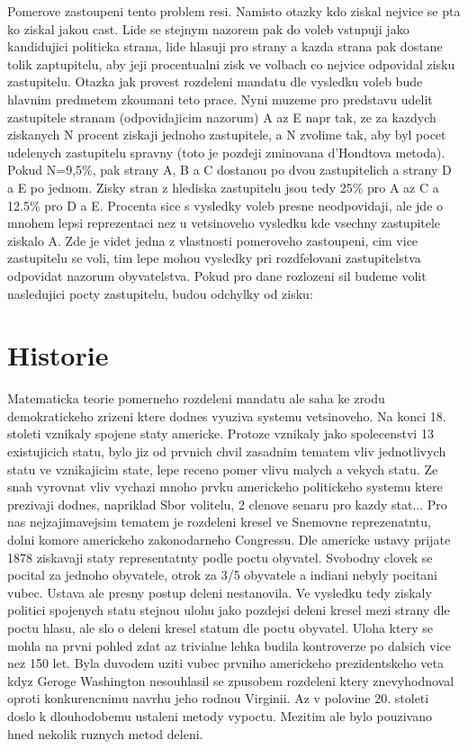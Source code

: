 \documentclass[12pt,a4paper]{article}
\begin{document}
Pomerove zastoupeni tento problem resi. Namisto otazky kdo ziskal nejvice se pta ko ziskal jakou cast. Lide se stejnym nazorem pak do voleb vstupuji jako kandidujici politicka strana, lide hlasuji pro strany a kazda strana pak dostane tolik zaptupitelu, aby jeji procentualni zisk ve volbach co nejvice odpovidal zisku zastupitelu. Otazka jak provest rozdeleni mandatu dle vysledku voleb bude hlavnim predmetem zkoumani teto prace. Nyni muzeme pro predstavu udelit zastupitele stranam (odpovidajicim nazorum) A az E napr tak, ze za kazdych ziskanych N procent ziskaji jednoho zastupitele, a N zvolime tak, aby byl pocet udelenych zastupitelu spravny (toto je pozdeji zminovana d'Hondtova metoda). Pokud N=9,5\%, pak strany A, B a C dostanou po dvou zastupitelich a strany D a E po jednom. Zisky stran z hlediska zastupitelu jsou tedy 25\% pro A az C a 12.5\% pro D a E. Procenta sice s vysledky voleb presne neodpovidaji, ale jde o mnohem lepsi reprezentaci nez u vetsinoveho vysledku kde vsechny zastupitele ziskalo A. Zde je videt jedna z vlastnosti pomeroveho zastoupeni, cim vice zastupitelu se voli, tim lepe mohou vysledky pri rozdfelovani zastupitelstva odpovidat nazorum obyvatelstva. Pokud pro dane rozlozeni sil budeme volit nasledujici pocty zastupitelu, budou odchylky od  zisku:

\section{Historie}
Matematicka teorie pomerneho rozdeleni mandatu ale saha ke zrodu demokratickeho zrizeni ktere dodnes vyuziva systemu vetsinoveho. Na konci 18. stoleti vznikaly spojene staty americke. Protoze vznikaly jako spolecenstvi 13 existujicich statu, bylo jiz od prvnich chvil zasadnim tematem vliv jednotlivych statu ve vznikajicim state, lepe receno pomer vlivu malych a vekych statu. Ze snah vyrovnat vliv vychazi mnoho prvku americkeho politickeho systemu ktere prezivaji dodnes, napriklad Sbor volitelu, 2 clenove senaru pro kazdy stat... 
Pro nas nejzajimavejsim tematem je rozdeleni kresel ve Snemovne reprezenatntu, dolni komore americkeho zakonodarneho Congressu. Dle americke ustavy prijate 1878 ziskavaji staty representatnty podle poctu obyvatel. Svobodny clovek se pocital za jednoho obyvatele, otrok za 3/5 obyvatele a indiani nebyly pocitani vubec. Ustava ale presny postup deleni nestanovila. Ve vysledku tedy ziskaly politici spojenych statu stejnou ulohu jako pozdejsi deleni kresel mezi strany dle poctu hlasu, ale slo o deleni kresel statum dle poctu obyvatel. 
Uloha ktery se mohla na prvni pohled zdat az trivialne lehka budila kontroverze po dalsich vice nez 150 let. Byla duvodem uziti vubec prvniho americkeho prezidentskeho veta kdyz Geroge Washington nesouhlasil se zpusobem rozdeleni ktery znevyhodnoval oproti konkurencnimu navrhu jeho rodnou Virginii. Az v polovine 20. stoleti doslo k dlouhodobemu ustaleni metody vypoctu. Mezitim ale bylo pouzivano hned nekolik ruznych metod deleni. %
\end{document}
